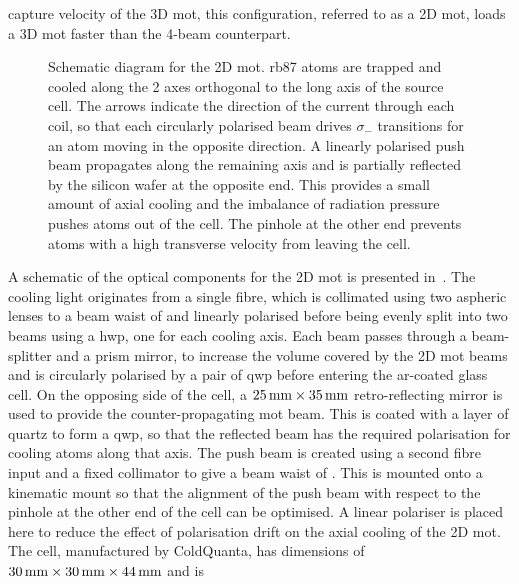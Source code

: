 capture velocity of the 3D \ac{mot}, this configuration, referred to as a 2D\+ \ac{mot}, loads a 3D
\ac{mot} faster than the 4-beam counterpart. \par\noindent
\begin{figure}
	\centering
	\def\svgwidth{0.5\textwidth}
	
	\caption[Schematic for the 2D \ac{mot}]{Schematic diagram for the 2D \ac{mot}. \ac{rb87} atoms are trapped and cooled along the 2 axes orthogonal to the long axis of the source cell. The arrows indicate the direction of the current through each coil, so that each circularly polarised beam drives \(\sigma_-\) transitions for an atom moving in the opposite direction. A linearly polarised push beam propagates along the remaining axis and is partially reflected by the silicon wafer at the opposite end. This provides a small amount of axial cooling and the imbalance of radiation pressure pushes atoms out of the cell. The pinhole at the other end prevents atoms with a high transverse velocity from leaving the cell.}
	\label{fig:2D_mot_diagram}
\end{figure}
A schematic of the optical components for the 2D \ac{mot} is presented
in~. The cooling light originates from a single
fibre, which is collimated using two aspheric lenses to a beam waist of
 and linearly polarised before being evenly split
into two beams using a \ac{hwp}, one for each cooling axis. Each beam passes
through a beam-splitter and a prism mirror, to increase the volume covered by
the 2D \ac{mot} beams and is circularly polarised by a pair of \ac{qwp} before
entering the ar-coated glass cell. On the opposing side of the cell, a
\(\sivalue{25}{\milli\metre} \times \sivalue{35}{\milli\metre}\)
retro-reflecting mirror is used to provide the counter-propagating \ac{mot}
beam. This is coated with a layer of quartz to form a \ac{qwp}, so that the
reflected beam has the required polarisation for cooling atoms along that axis.
The push beam is created using a second fibre input and a fixed collimator to
give a beam waist of . This is mounted onto a
 kinematic mount so that the alignment of the push beam with
respect to the  pinhole at the other end of the cell
can be optimised. A linear polariser is placed here to reduce the effect of
polarisation drift on the axial cooling of the 2D \ac{mot}. The cell,
manufactured by ColdQuanta, has dimensions of \(\sivalue{30}{\milli\metre}
\times \sivalue{30}{\milli\metre} \times \sivalue{44}{\milli\metre}\) and is
